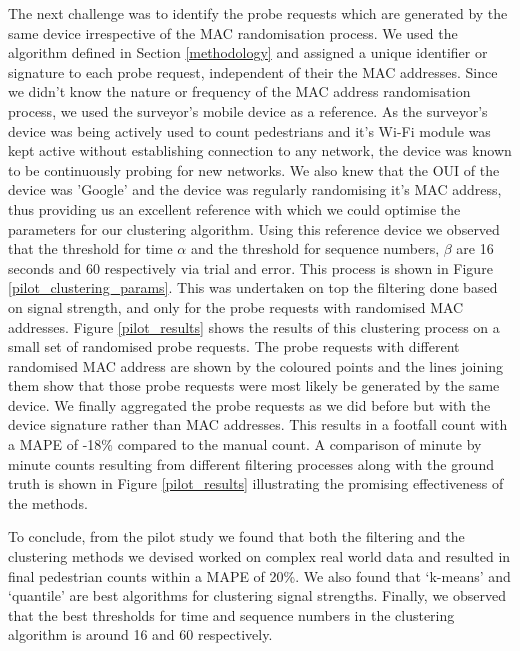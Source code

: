 The next challenge was to identify the probe requests which are generated by the
same device irrespective of the MAC randomisation process. We used the algorithm
defined in Section \ref{methodology} and assigned a unique identifier or
signature to each probe request, independent of their the MAC addresses. Since
we didn't know the nature or frequency of the MAC address randomisation process,
we used the surveyor's mobile device as a reference. As the surveyor's device
was being actively used to count pedestrians and it's Wi-Fi module was kept
active without establishing connection to any network, the device was known to
be continuously probing for new networks. We also knew that the OUI of the
device was 'Google' and the device was regularly randomising it's MAC address,
thus providing us an excellent reference with which we could optimise the
parameters for our clustering algorithm. Using this reference device we observed
that the threshold for time $\alpha$ and the threshold for sequence numbers,
$\beta$ are 16 seconds and 60 respectively via trial and error. This process is
shown in Figure \ref{pilot_clustering_params}. This was undertaken on top the
filtering done based on signal strength, and only for the probe requests with
randomised MAC addresses. Figure \ref{pilot_results} shows the results of this
clustering process on a small set of randomised probe requests. The probe
requests with different randomised MAC address are shown by the coloured points
and the lines joining them show that those probe requests were most likely be
generated by the same device. We finally aggregated the probe requests as we did
before but with the device signature rather than MAC addresses. This results in
a footfall count with a MAPE of -18\% compared to the manual count. A comparison
of minute by minute counts resulting from different filtering processes along
with the ground truth is shown in Figure \ref{pilot_results} illustrating the
promising effectiveness of the methods.

To conclude, from the pilot study we found that both the filtering and the
clustering methods we devised worked on complex real world data and resulted in
final pedestrian counts within a MAPE of 20\%. We also found that `k-means' and
`quantile' are best algorithms for clustering signal strengths. Finally, we
observed that the best thresholds for time and sequence numbers in the
clustering algorithm is around 16 and 60 respectively.
